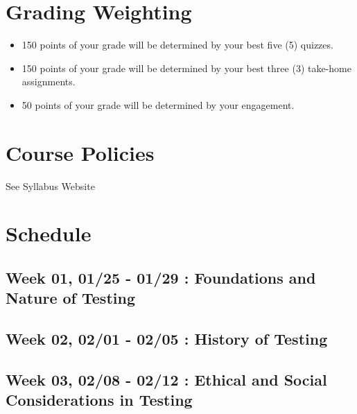 \hypertarget{grading-weighting}{%
\section{Grading Weighting}\label{grading-weighting}}

\begin{itemize}
\tightlist
\item
  150 points of your grade will be determined by your best five (5) quizzes.
\item
  150 points of your grade will be determined by your best three (3) take-home assignments.
\item
  50 points of your grade will be determined by your engagement.
\end{itemize}

\hypertarget{course-policies}{%
\section{Course Policies}\label{course-policies}}

See Syllabus Website

\hypertarget{schedule-1}{%
\section{Schedule}\label{schedule-1}}

\hypertarget{week-01-0125---0129-foundations-and-nature-of-testing}{%
\subsection{Week 01, 01/25 - 01/29 : Foundations and Nature of Testing}\label{week-01-0125---0129-foundations-and-nature-of-testing}}

\hypertarget{week-02-0201---0205-history-of-testing}{%
\subsection{Week 02, 02/01 - 02/05 : History of Testing}\label{week-02-0201---0205-history-of-testing}}

\hypertarget{week-03-0208---0212-ethical-and-social-considerations-in-testing}{%
\subsection{Week 03, 02/08 - 02/12 : Ethical and Social Considerations in Testing}\label{week-03-0208---0212-ethical-and-social-considerations-in-testing}}

